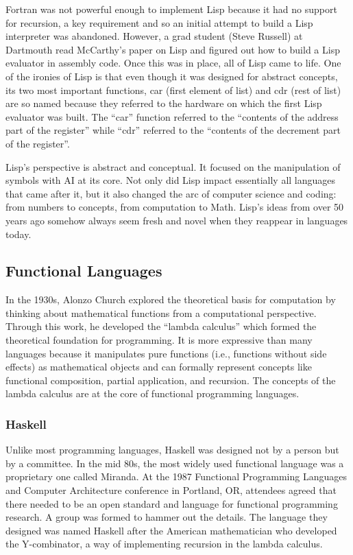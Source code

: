 Fortran was not powerful enough to implement Lisp because it had no support for
recursion, a key requirement and so an initial attempt to build a Lisp
interpreter was abandoned. However, a grad student (Steve Russell) at Dartmouth
read McCarthy's paper on Lisp and figured out how to build a Lisp evaluator in
assembly code. Once this was in place, all of Lisp came to life. One of the
ironies of Lisp is that even though it was designed for abstract concepts, its
two most important functions, car (first element of list) and cdr (rest of
list) are so named because they referred to the hardware on which the first
Lisp evaluator was built. The ``car'' function referred to the ``contents of
the address part of the register'' while ``cdr'' referred to the ``contents of
the decrement part of the register''.

Lisp's perspective is abstract and conceptual. It focused on the manipulation
of symbols with AI at its core. Not only did Lisp impact essentially all
languages that came after it, but it also changed the arc of computer science
and coding: from numbers to concepts, from computation to Math. Lisp's ideas
from over 50 years ago somehow always seem fresh and novel when they reappear
in languages today.

\subsection{Functional Languages}

In the 1930s, Alonzo Church explored the theoretical basis for computation by
thinking about mathematical functions from a computational perspective. Through
this work, he developed the ``lambda calculus'' which formed the theoretical
foundation for programming. It is more expressive than many languages because
it manipulates pure functions (i.e., functions without side effects) as
mathematical objects and can formally represent concepts like functional
composition, partial application, and recursion. The concepts of the lambda
calculus are at the core of functional programming languages.

\subsubsection{Haskell}

Unlike most programming languages, Haskell was designed not by a person but by
a committee. In the mid 80s, the most widely used functional language was a
proprietary one called Miranda. At the 1987 Functional Programming Languages
and Computer Architecture conference in Portland, OR, attendees agreed that
there needed to be an open standard and language for functional programming
research. A group was formed to hammer out the details. The language they
designed was named Haskell after the American mathematician who developed the
Y-combinator, a way of implementing recursion in the lambda calculus.

